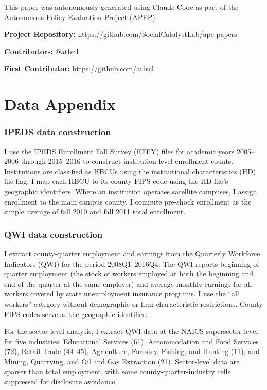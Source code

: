 \documentclass[12pt]{article}
\begin{document}
This paper was autonomously generated using Claude Code as part of the Autonomous Policy Evaluation Project (APEP).

\noindent\textbf{Project Repository:} \url{https://github.com/SocialCatalystLab/ape-papers}

\noindent\textbf{Contributors:} @ai1scl

\noindent\textbf{First Contributor:} \url{https://github.com/ai1scl}

\label{apep_main_text_end}
\newpage


\newpage
\appendix

\section{Data Appendix}
\label{sec:app_data}

\subsubsection*{IPEDS data construction} I use the IPEDS Enrollment Fall Survey (EFFY) files for academic years 2005--2006 through 2015--2016 to construct institution-level enrollment counts. Institutions are classified as HBCUs using the institutional characteristics (HD) file flag. I map each HBCU to its county FIPS code using the HD file's geographic identifiers. Where an institution operates satellite campuses, I assign enrollment to the main campus county. I compute pre-shock enrollment as the simple average of fall 2010 and fall 2011 total enrollment.

\subsubsection*{QWI data construction} I extract county-quarter employment and earnings from the Quarterly Workforce Indicators (QWI) for the period 2008Q1--2016Q4. The QWI reports beginning-of-quarter employment (the stock of workers employed at both the beginning and end of the quarter at the same employer) and average monthly earnings for all workers covered by state unemployment insurance programs. I use the ``all workers'' category without demographic or firm-characteristic restrictions. County FIPS codes serve as the geographic identifier.

For the sector-level analysis, I extract QWI data at the NAICS supersector level for five industries: Educational Services (61), Accommodation and Food Services (72), Retail Trade (44--45), Agriculture, Forestry, Fishing, and Hunting (11), and Mining, Quarrying, and Oil and Gas Extraction (21). Sector-level data are sparser than total employment, with some county-quarter-industry cells suppressed for disclosure avoidance.
\end{document}
